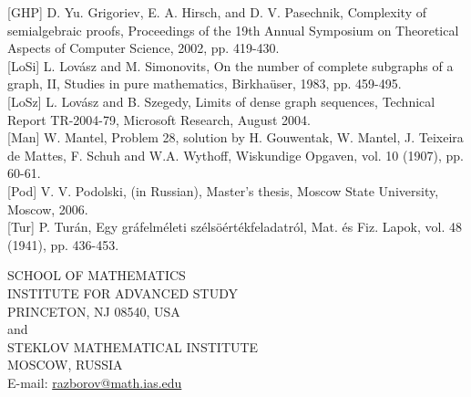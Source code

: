 \documentclass[10pt]{article}
\begin{document}
[GHP] D. Yu. Grigoriev, E. A. Hirsch, and D. V. Pasechnik, Complexity of semialgebraic proofs, Proceedings of the 19th Annual Symposium on Theoretical Aspects of Computer Science, 2002, pp. 419-430.\\[0pt]
[LoSi] L. Lovász and M. Simonovits, On the number of complete subgraphs of a graph, II, Studies in pure mathematics, Birkhaüser, 1983, pp. 459-495.\\[0pt]
[LoSz] L. Lovász and B. Szegedy, Limits of dense graph sequences, Technical Report TR-2004-79, Microsoft Research, August 2004.\\[0pt]
[Man] W. Mantel, Problem 28, solution by H. Gouwentak, W. Mantel, J. Teixeira de Mattes, F. Schuh and W.A. Wythoff, Wiskundige Opgaven, vol. 10 (1907), pp. 60-61.\\[0pt]
[Pod] V. V. Podolski, (in Russian), Master's thesis, Moscow State University, Moscow, 2006.\\[0pt]
[Tur] P. Turán, Egy gráfelméleti szélsöértékfeladatról, Mat. és Fiz. Lapok, vol. 48 (1941), pp. 436-453.

SCHOOL OF MATHEMATICS\\
INSTITUTE FOR ADVANCED STUDY\\
PRINCETON, NJ 08540, USA\\
and\\
STEKLOV MATHEMATICAL INSTITUTE\\
MOSCOW, RUSSIA\\
E-mail: \href{mailto:razborov@math.ias.edu}{razborov@math.ias.edu}
\end{document}
